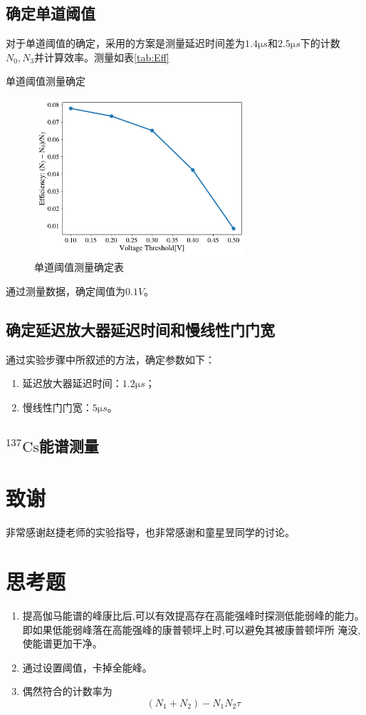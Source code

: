 \documentclass{article}
\begin{document}
\subsection{确定单道阈值}
对于单道阈值的确定，采用的方案是测量延迟时间差为$1.4\si{\micro s}$和$2.5\si{\micro s}$下的计数$N_0,N_3$并计算效率。测量如表\ref{tab:Eff}
\begin{table}[htbp]
    \centering
    \caption{单道阈值测量确定\label{tab:Eff}}
    
\end{table}
\begin{figure}[htbp]
    \centering
    \includegraphics[width=0.7\textwidth]{../plots/Efficiency.pdf}
    \caption{单道阈值测量确定表\label{fig:Eff}}
\end{figure}

通过测量数据，确定阈值为$0.1\si{V}$。
\subsection{确定延迟放大器延迟时间和慢线性门门宽}
通过实验步骤中所叙述的方法，确定参数如下：
\begin{enumerate}
    \item 延迟放大器延迟时间：$1.2\si{\micro s}$；
    \item 慢线性门门宽：$5\si{\micro s}$。
\end{enumerate}
\subsection{$^{137}\text{Cs}$能谱测量}


\section{致谢}
    非常感谢赵捷老师的实验指导，也非常感谢和童星昱同学的讨论。
    \clearpage
    \appendix
    \appendixpage
    \section{思考题}
    \begin{enumerate}
        \item 提高伽马能谱的峰康比后,可以有效提高存在高能强峰时探测低能弱峰的能力。即如果低能弱峰落在高能强峰的康普顿坪上时,可以避免其被康普顿坪所
        淹没,使能谱更加干净。
        \item 通过设置阈值，卡掉全能峰。
        \item 偶然符合的计数率为
        \begin{equation}
            (N_1+N_2)-N_1N_2\tau
        \end{equation}
    \end{enumerate}
\end{document}
